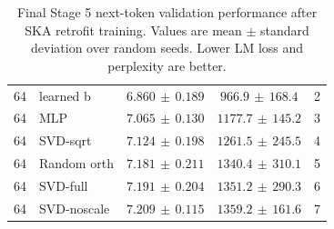 \begin{table}[h!]
\begin{tabular}{c l c c c}
64 & learned b & $6.860\,\pm\,0.189$ & $966.9\,\pm\,168.4$ & 2 \\
64 & MLP & $7.065\,\pm\,0.130$ & $1177.7\,\pm\,145.2$ & 3 \\
64 & SVD-sqrt & $7.124\,\pm\,0.198$ & $1261.5\,\pm\,245.5$ & 4 \\
64 & Random orth & $7.181\,\pm\,0.211$ & $1340.4\,\pm\,310.1$ & 5 \\
64 & SVD-full & $7.191\,\pm\,0.204$ & $1351.2\,\pm\,290.3$ & 6 \\
64 & SVD-noscale & $7.209\,\pm\,0.115$ & $1359.2\,\pm\,161.6$ & 7 \\
\hline
\end{tabular}
\caption{Final Stage 5 next-token validation performance after SKA retrofit training. Values are mean $\pm$ standard deviation over random seeds. Lower LM loss and perplexity are better.}
\label{tab:stage5-ranked-final-eval}
\end{table}
